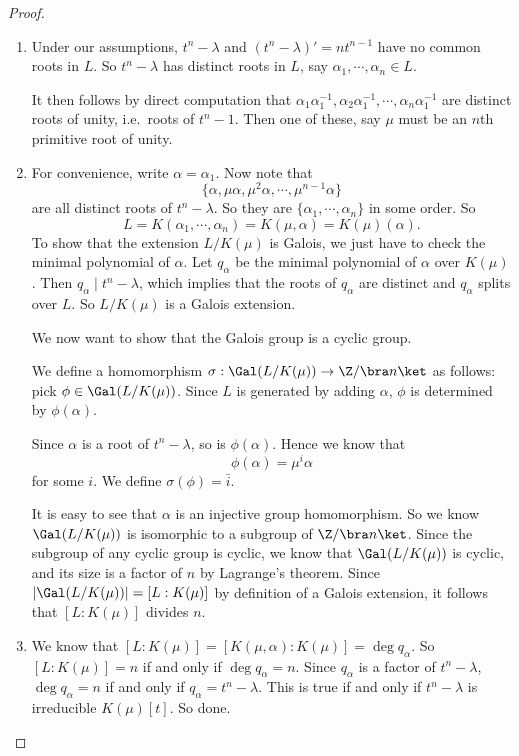 \documentclass[a4paper]{article}
\begin{document}
\begin{proof}\leavevmode
  \begin{enumerate}
    \item Under our assumptions, $t^n - \lambda$ and $(t^n - \lambda)' = nt^{n - 1}$ have no common roots in $L$. So $t^n - \lambda$ has distinct roots in $L$, say $\alpha_1, \cdots, \alpha_n \in L$.

      It then follows by direct computation that $\alpha_1 \alpha_1^{-1}, \alpha_2 \alpha_1^{-1}, \cdots, \alpha_n \alpha_1^{-1}$ are distinct roots of unity, i.e.\ roots of $t^n - 1$. Then one of these, say $\mu$ must be an $n$th primitive root of unity.
    \item For convenience, write $\alpha = \alpha_1$. Now note that
      \[
        \{\alpha, \mu\alpha, \mu^2 \alpha, \cdots, \mu^{n - 1} \alpha\}
      \]
      are all distinct roots of $t^n - \lambda$. So they are $\{\alpha_1, \cdots, \alpha_n\}$ in some order. So
      \[
        L = K(\alpha_1, \cdots, \alpha_n) = K(\mu, \alpha) = K(\mu)(\alpha).
      \]
      To show that the extension $L/K(\mu)$ is Galois, we just have to check the minimal polynomial of $\alpha$. Let $q_\alpha$ be the minimal polynomial of $\alpha$ over $K(\mu)$. Then $q_\alpha \mid t^n - \lambda$, which implies that the roots of $q_\alpha$ are distinct and $q_\alpha$ splits over $L$. So $L/K(\mu)$ is a Galois extension.

      We now want to show that the Galois group is a cyclic group.

      We define a homomorphism $\sigma: \Gal(L/K(\mu)) \to \Z/\bra n\ket$ as follows: pick $\phi \in \Gal(L/K(\mu))$. Since $L$ is generated by adding $\alpha$, $\phi$ is determined by $\phi(\alpha)$.

      Since $\alpha$ is a root of $t^{n} - \lambda$, so is $\phi(\alpha)$. Hence we know that
      \[
        \phi(\alpha) = \mu^i \alpha
      \]
      for some $i$. We define $\sigma(\phi) = \bar{i}$.

      It is easy to see that $\alpha$ is an injective group homomorphism. So we know $\Gal(L/K(\mu))$ is isomorphic to a subgroup of $\Z/\bra n\ket$. Since the subgroup of any cyclic group is cyclic, we know that $\Gal(L/K(\mu))$ is cyclic, and its size is a factor of $n$ by Lagrange's theorem. Since $|\Gal(L/K(\mu))| = [L:K(\mu)]$ by definition of a Galois extension, it follows that $[L:K(\mu)]$ divides $n$.

    \item We know that $[L:K(\mu)] = [K(\mu, \alpha): K(\mu)] = \deg q_\alpha$. So $[L:K(\mu)] = n$ if and only if $\deg q_\alpha = n$. Since $q_\alpha$ is a factor of $t^n - \lambda$, $\deg q_\alpha = n$ if and only if $q_\alpha = t^n - \lambda$. This is true if and only if $t^n - \lambda$ is irreducible $K(\mu)[t]$. So done.
  \end{enumerate}
\end{proof}
\end{document}
